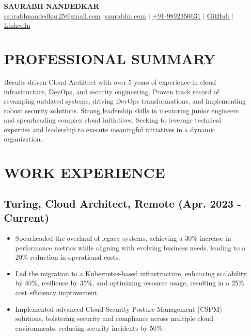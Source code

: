 \documentclass[a4paper,9pt]{article}
\begin{document}
\begin{center}
    \textbf{\LARGE SAURABH NANDEDKAR} \\
    \vspace{1pt}
    \href{mailto:saurabhnandedkar25@gmail.com}{saurabhnandedkar25@gmail.com} $\vert$\href{https://saurabhn.com}{saurabhn.com} $\vert$ \href{tel:+919892356631}{+91-9892356631}
 $\vert$ \href{https://github.com/EXTREMOPHILARUM}{GitHub} $\vert$ \href{https://linkedin.com/in/extremophilarum}{LinkedIn} 
\end{center}

\vspace{3pt}

\section*{PROFESSIONAL SUMMARY}

Results-driven Cloud Architect with over 5 years of experience in cloud infrastructure, DevOps, and security engineering. Proven track record of revamping outdated systems, driving DevOps transformations, and implementing robust security solutions. Strong leadership skills in mentoring junior engineers and spearheading complex cloud initiatives. Seeking to leverage technical expertise and leadership to execute meaningful initiatives in a dynamic organization.

\section*{WORK EXPERIENCE}

\subsection*{Turing, Cloud Architect, Remote (Apr. 2023 - Current)}
\begin{itemize}
    \item Spearheaded the overhaul of legacy systems, achieving a 30\% increase in performance metrics while aligning with evolving business needs, leading to a 20\% reduction in operational costs.
    \item Led the migration to a Kubernetes-based infrastructure, enhancing scalability by 40\%, resilience by 35\%, and optimizing resource usage, resulting in a 25\% cost efficiency improvement.
    \item Implemented advanced Cloud Security Posture Management (CSPM) solutions, bolstering security and compliance across multiple cloud environments, reducing security incidents by 50\%.
\end{itemize}
\end{document}
